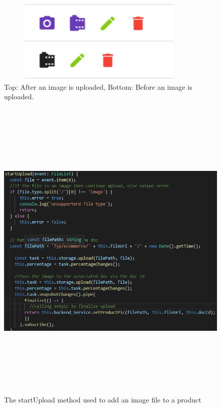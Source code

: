 \begin{figure}[h!]
    \caption{Top: After an image is uploaded,
    Bottom: Before an image is uploaded.}
	\centering
	\includegraphics[width=10cm, height=4cm]{images/photoupload.png}
\end{figure}

\begin{figure}[h!]
    \caption{The startUpload method used to add an image file to a product}
	\centering
	\includegraphics[width=15cm, height=15cm]{images/uploadmethod.png}
\end{figure}




















